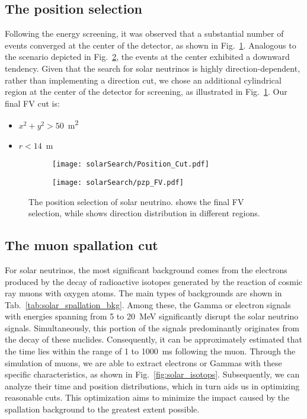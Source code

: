 \subsection{The position selection}
Following the energy screening, it was observed that a substantial number of events converged at the center of the detector, as shown in Fig.~\ref{fig:solar_pos_cut}. Analogous to the scenario depicted in Fig.~\ref{fig:solar_direction}, the events at the center exhibited a downward tendency. Given that the search for solar neutrinos is highly direction-dependent, rather than implementing a direction cut, we chose an additional cylindrical region at the center of the detector for screening, as illustrated in Fig.~\ref{fig:solar_pos_cut}. Our final FV cut is:
\begin{itemize}
	\item $x^2+y^2>50$~\si{m^2}
	\item $r<14$~\si{m}
\end{itemize}

\begin{figure}[htbp]
	\centering
	\begin{subfigure}{0.5\textwidth}
		\centering
		\texttt{[image: solarSearch/Position\_Cut.pdf]}
		\caption{}
		\label{fig:solar_pos_cut}
	\end{subfigure}%
	\begin{subfigure}{0.5\textwidth}
		\centering
		\texttt{[image: solarSearch/pzp\_FV.pdf]}
		\caption{}
		\label{fig:solar_direction}
	\end{subfigure}
	\caption{The position selection of solar neutrino.  shows the final FV selection, while  shows direction distribution in different regions.}
	\label{fig:solar_position_cut}
\end{figure}

\subsection{The muon spallation cut}
For solar neutrinos, the most significant background comes from the electrons produced by the decay of radioactive isotopes generated by the reaction of cosmic ray muons with oxygen atoms. The main types of backgrounds are shown in Tab.~\ref{tab:solar_spallation_bkg}. Among these, the Gamma or electron signals with energies spanning from 5 to \SI{20}{MeV} significantly disrupt the solar neutrino signals. Simultaneously, this portion of the signals predominantly originates from the decay of these nuclides. Consequently, it can be approximately estimated that the time lies within the range of 1 to \SI{1000}{ms} following the muon. Through the simulation of muons, we are able to extract electrons or Gammas with these specific characteristics, as shown in Fig.~\ref{fig:solar_isotops}. Subsequently, we can analyze their time and position distributions, which in turn aids us in optimizing reasonable cuts. This optimization aims to minimize the impact caused by the spallation background to the greatest extent possible.

